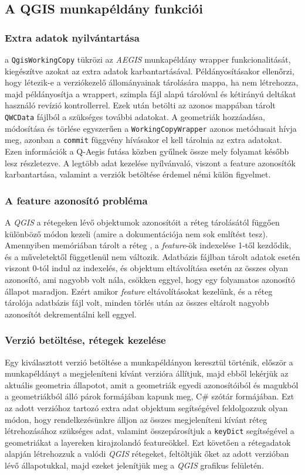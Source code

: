 \subsection{A QGIS munkapéldány funkciói}
\subsubsection{Extra adatok nyilvántartása}
a \texttt{QgisWorkingCopy} tükrözi az \emph{AEGIS} munkapéldány wrapper funkcionalitását, kiegészítve azokat az extra adatok karbantartásával. Példányosításakor ellenőrzi, hogy létezik-e a verziókezelő állományainak tárolására mappa, ha nem létrehozza, majd példányosítja a wrappert, szimpla fájl alapú tárolóval és kétirányú deltákat használó revízió kontrollerrel. Ezek után betölti az azonos mappában tárolt \texttt{QWCData} fájlból a szükséges további adatokat.
A geometriák hozzáadása, módosítása és törlése egyszerűen a \texttt{WorkingCopyWrapper} azonos metódusait hívja meg, azonban a \texttt{commit} függvény hívásakor el kell tárolnia az extra adatokat. Ezen információk a Q-Aegis futása közben gyűlnek össze mely folyamat később lesz részletezve. A legtöbb adat kezelése nyílvánvaló, viszont a feature azonosítók karbantartása, valamint a verziók betöltése érdemel némi külön figyelmet.
\subsubsection{A feature azonosító probléma}
A \emph{QGIS} a rétegeken lévő objektumok azonosítóit a réteg tárolásától függően különböző módon kezeli (amire a dokumentációja nem sok említést tesz). Amennyiben memóriában tárolt a réteg , a \emph{feature}-ök indexelése 1-től kezdődik, és a műveletektől függetlenül nem változik. Adatbázis fájlban tárolt adatok esetén viszont 0-tól indul az indexelés, és objektum eltávolítása esetén az összes olyan azonosító, ami nagyobb volt nála, csökken eggyel, hogy egy folyamatos azonosító állapot maradjon. Ezért amikor \emph{feature} eltávolításokat kezelünk, és a réteg tárolója adatbázis fájl volt, minden törlés után az összes eltárolt nagyobb azonosítót dekrementálni kell eggyel.
\subsubsection{Verzió betöltése, rétegek kezelése}
Egy kiválasztott verzió betöltése a munkapéldányon keresztül történik, először a munkapéldányt a megjeleníteni kívánt verzióra állítjuk, majd ebből lekérjük az aktuális geometria állapotot, amit a geometriák egyedi azonosítóiból és magukból a geometriákból álló párok formájában kapunk meg, C\# szótár formájában. Ezt az adott verzióhoz tartozó extra adat objektum segítségével feldolgozzuk olyan módon, hogy rendelkezésünkre álljon az összes megjeleníteni kívánt réteg létrehozásához szükséges adat, valamint összepárosítjuk a \texttt{keyDict} segítségével a geometriákat a layereken kirajzolandó featureökkel. Ezt követően a rétegadatok alapján létrehozzuk a valódi \emph{QGIS} rétegeket, feltöltjük őket az adott verzióban lévő állapotukkal, majd ezeket jelenítjük meg a \emph{QGIS} grafikus felületén.

